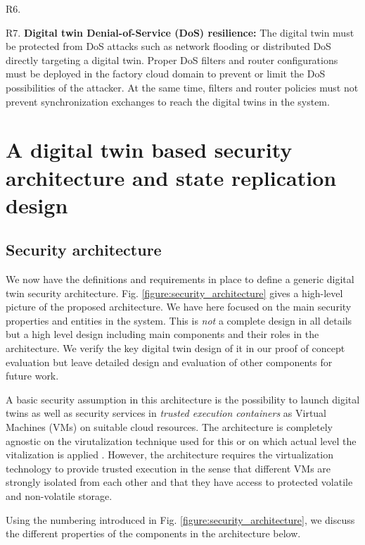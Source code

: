 \begin{labeling}{R6.}
\item [R7.] \textbf{Digital twin Denial-of-Service (DoS) resilience:} The digital twin must be protected from DoS attacks such as network flooding or distributed DoS directly targeting a digital twin. Proper DoS filters and router configurations must be deployed in the factory cloud domain to prevent or limit the DoS possibilities of the attacker. At the same time, filters and router policies must not prevent synchronization exchanges to reach the digital twins in the system.
\end{labeling}

\section{A digital twin based security architecture and state replication design}
\label{architecturedesign}

\subsection{Security architecture}
\label{dtwinsecurity:architecture}
We now have the definitions and requirements in place to define a generic digital twin security architecture. Fig. \ref{figure:security_architecture} gives a high-level picture of the proposed architecture. We have here focused on the main security properties and entities in the system. This is {\it not} a complete design in all details but a high level design including main components and their roles in the architecture. We verify the key digital twin design of it in our proof of concept evaluation but leave detailed design and evaluation of other components for future work.

A basic security assumption in this architecture is the possibility to launch digital twins as well as security services in \textit{trusted execution containers} as Virtual Machines (VMs) on suitable cloud resources. The architecture is completely agnostic on the virutalization technique used for this or on which actual level the vitalization is applied  \cite{Smith2005} \cite{Gehrmann2016}. However, the architecture requires the virtualization technology to provide trusted execution in the sense that different VMs are strongly isolated from each other and that they have access to protected volatile and non-volatile storage.

Using the numbering introduced in Fig. \ref{figure:security_architecture}, we discuss the different properties of the components in the architecture below.
